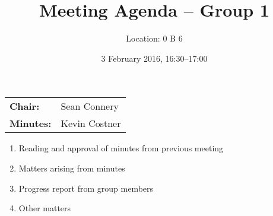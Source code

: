 \documentclass{cce2014-meetings}
\title{Meeting Agenda -- Group 1}
\author{Location: 0 B 6}
\date{3 February 2016, 16:30--17:00}
\begin{document}
\maketitle
\begin{center}
\begin{tabular}{ll}
\textbf{Chair:}   & Sean Connery \\
\textbf{Minutes:} & Kevin Costner
\end{tabular}
\end{center}

\begin{enumerate}

\item Reading and approval of minutes from previous meeting

\item Matters arising from minutes

\item Progress report from group members


\item Other matters

\end{enumerate}
\end{document}
